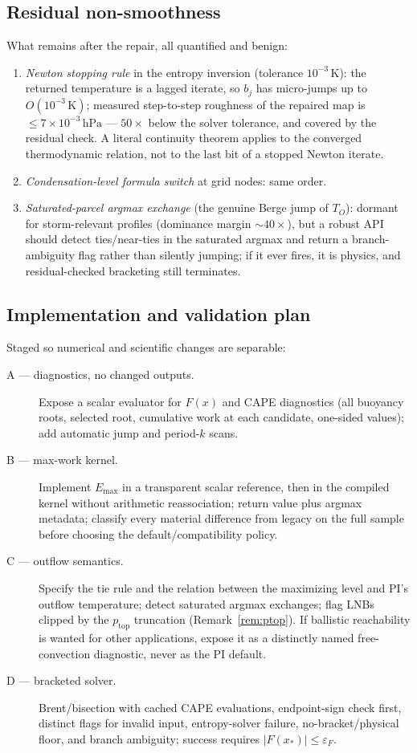 \documentclass[11pt,a4paper]{article}
\theoremstyle{definition}
\newcommand{\Emax}{E_{\mathrm{max}}}
\newcommand{\hPa}{\,\mathrm{hPa}}
\newcommand{\K}{\,\mathrm{K}}
\begin{document}
\subsection{Residual non-smoothness}\label{sec:micro}

What remains after the repair, all quantified and benign:
\begin{enumerate}
\item \emph{Newton stopping rule} in the entropy inversion (tolerance
$10^{-3}\K$): the returned temperature is a lagged iterate, so $b_j$ has
micro-jumps up to $O(10^{-3}\K)$; measured step-to-step roughness of the
repaired map is $\le7\times10^{-3}\hPa$ --- $50\times$ below the solver
tolerance, and covered by the residual check.  A literal continuity theorem
applies to the converged thermodynamic relation, not to the last bit of a
stopped Newton iterate.
\item \emph{Condensation-level formula switch} at grid nodes: same order.
\item \emph{Saturated-parcel argmax exchange} (the genuine Berge jump of
$T_O$): dormant for storm-relevant profiles (dominance margin
$\sim40\times$), but a robust API should detect ties/near-ties in the
saturated argmax and return a branch-ambiguity flag rather than silently
jumping; if it ever fires, it is physics, and residual-checked bracketing
still terminates.
\end{enumerate}

\subsection{Implementation and validation plan}

Staged so numerical and scientific changes are separable:

\begin{description}
\item[A --- diagnostics, no changed outputs.]  Expose a scalar evaluator for
$F(x)$ and CAPE diagnostics (all buoyancy roots, selected root, cumulative
work at each candidate, one-sided values); add automatic jump and
period-$k$ scans.
\item[B --- max-work kernel.]  Implement $\Emax$ in a transparent scalar
reference, then in the compiled kernel without arithmetic reassociation;
return value plus argmax metadata; classify every material difference from
legacy on the full sample before choosing the default/compatibility policy.
\item[C --- outflow semantics.]  Specify the tie rule and the relation
between the maximizing level and PI's outflow temperature; detect saturated
argmax exchanges; flag LNBs clipped by the $p_{\mathrm{top}}$ truncation
(Remark~\ref{rem:ptop}).  If ballistic reachability is wanted for other
applications, expose it as a distinctly named free-convection diagnostic,
never as the PI default.
\item[D --- bracketed solver.]  Brent/bisection with cached CAPE
evaluations, endpoint-sign check first, distinct flags for invalid input,
entropy-solver failure, no-bracket/physical floor, and branch ambiguity;
success requires $|F(x_*)|\le\varepsilon_F$.
\end{description}
\end{document}
